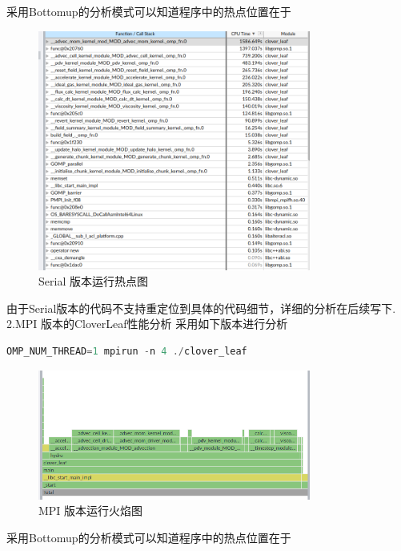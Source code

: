 \documentclass{article}
\begin{document}
\begin{CJK}{UTF8}{gbsn}
采用Bottomup的分析模式可以知道程序中的热点位置在于 \\
\begin{figure}[H]
    \centering
    \includegraphics[width=0.8\textwidth]{./call2.png}
    \caption{Serial 版本运行热点图}
\end{figure}
由于Serial版本的代码不支持重定位到具体的代码细节，详细的分析在后续写下.\\
2.MPI 版本的CloverLeaf性能分析
采用如下版本进行分析\\
\begin{lstlisting}[language=C++]
    OMP_NUM_THREAD=1 mpirun -n 4 ./clover_leaf
\end{lstlisting} 
\begin{figure}[H]
    \centering
    \includegraphics[width=0.8\textwidth]{./call3.png}
    \caption{MPI 版本运行火焰图}
\end{figure}
采用Bottomup的分析模式可以知道程序中的热点位置在于 \\
\begin{figure}[H]
    \centering

\end{figure}
\end{CJK}
\end{document}

